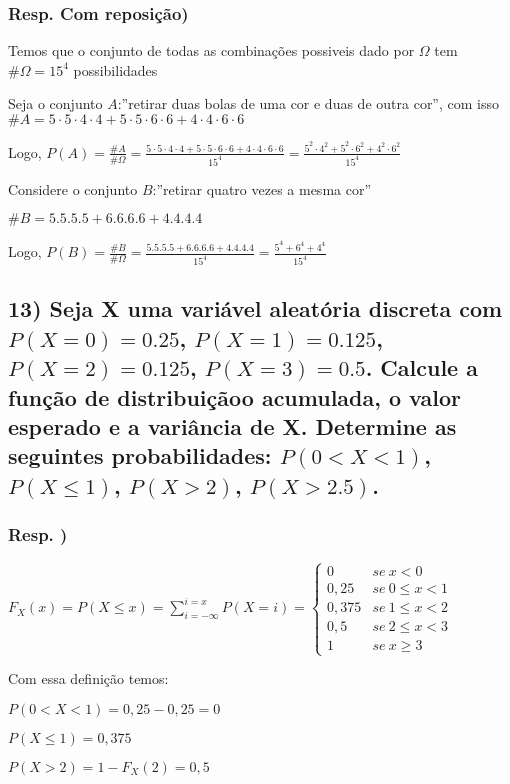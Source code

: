 \documentclass[english]{article}
\begin{document}
\subsubsection*{\textmd{Resp. Com reposição)}}

Temos que o conjunto de todas as combinações possiveis dado por $\Omega$
tem $\#\Omega=15^{4}$ possibilidades

Seja o conjunto $A$:''retirar duas bolas de uma cor e duas de outra
cor'', com isso $\#A=5\cdot5\cdot4\cdot4+5\cdot5\cdot6\cdot6+4\cdot4\cdot6\cdot6$

Logo, $P(A)=\frac{\#A}{\#\Omega}=\frac{5\cdot5\cdot4\cdot4+5\cdot5\cdot6\cdot6+4\cdot4\cdot6\cdot6}{15^{4}}=\frac{5^{2}\cdot4^{2}+5^{2}\cdot6^{2}+4^{2}\cdot6^{2}}{15^{4}}$

Considere o conjunto $B$:''retirar quatro vezes a mesma cor''

$\#B=5.5.5.5+6.6.6.6+4.4.4.4$

Logo, $P(B)=\frac{\#B}{\#\Omega}=\frac{5.5.5.5+6.6.6.6+4.4.4.4}{15^{4}}=\frac{5^{4}+6^{4}+4^{4}}{15^{4}}$

\textbf{\textcompwordmark{}}


\subsection*{\textmd{13) Seja X uma variável aleatória discreta com $P(X=0)=0.25$,
$P(X=1)=0.125$, $P(X=2)=0.125$, $P(X=3)=0.5$. Calcule a função
de distribuiçãoo acumulada, o valor esperado e a variância de X. Determine
as seguintes probabilidades: $P(0<X<1)$, $P(X\le1)$, $P(X>2)$,
$P(X>2.5)$.}}


\subsubsection*{\textmd{Resp. )}}

$F_{X}(x)=P(X\leq x)=\sum_{i=-\infty}^{i=x}P(X=i)=\begin{cases}
0 & se\: x<0\\
0,25 & se\:0\leq x<1\\
0,375 & se\:1\leq x<2\\
0,5 & se\:2\leq x<3\\
1 & se\: x\geq3
\end{cases}$

Com essa definição temos:

$P(0<X<1)=0,25-0,25=0$

$P(X\le1)=0,375$

$P(X>2)=1-F_{X}(2)=0,5$
\end{document}
